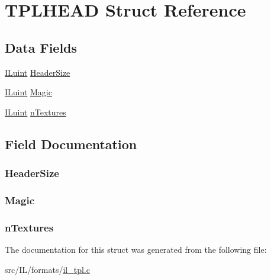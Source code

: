 \hypertarget{struct_t_p_l_h_e_a_d}{\section{T\-P\-L\-H\-E\-A\-D Struct Reference}
\label{struct_t_p_l_h_e_a_d}
}
\subsection*{Data Fields}
\begin{DoxyCompactItemize}
\item 
\hyperlink{il_8h_ac6508d0e9c19e32f32e00d54b5b8cf30}{I\-Luint} \hyperlink{struct_t_p_l_h_e_a_d_a9f6557e51cfc4ac65955403557bc0e0e}{Header\-Size}
\item 
\hyperlink{il_8h_ac6508d0e9c19e32f32e00d54b5b8cf30}{I\-Luint} \hyperlink{struct_t_p_l_h_e_a_d_a1457582ec4cef667fc2fbf0e7bc40385}{Magic}
\item 
\hyperlink{il_8h_ac6508d0e9c19e32f32e00d54b5b8cf30}{I\-Luint} \hyperlink{struct_t_p_l_h_e_a_d_a5c93d942376ffc825285b468867a3e4b}{n\-Textures}
\end{DoxyCompactItemize}


\subsection{Field Documentation}
\hypertarget{struct_t_p_l_h_e_a_d_a9f6557e51cfc4ac65955403557bc0e0e}{
\subsubsection[{Header\-Size}]{ Header\-Size}}\label{struct_t_p_l_h_e_a_d_a9f6557e51cfc4ac65955403557bc0e0e}
\hypertarget{struct_t_p_l_h_e_a_d_a1457582ec4cef667fc2fbf0e7bc40385}{
\subsubsection[{Magic}]{ Magic}}\label{struct_t_p_l_h_e_a_d_a1457582ec4cef667fc2fbf0e7bc40385}
\hypertarget{struct_t_p_l_h_e_a_d_a5c93d942376ffc825285b468867a3e4b}{
\subsubsection[{n\-Textures}]{ n\-Textures}}\label{struct_t_p_l_h_e_a_d_a5c93d942376ffc825285b468867a3e4b}


The documentation for this struct was generated from the following file\-:\begin{DoxyCompactItemize}
\item 
src/\-I\-L/formats/\hyperlink{il__tpl_8c}{il\-\_\-tpl.\-c}\end{DoxyCompactItemize}
